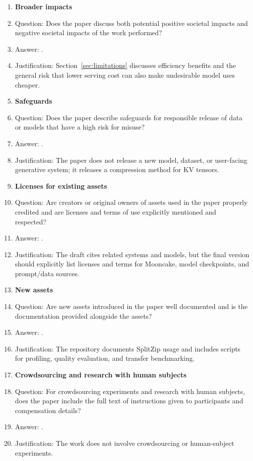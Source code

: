 \begin{enumerate}
\item {\bf Broader impacts}
    \item[] Question: Does the paper discuss both potential positive societal impacts and negative societal impacts of the work performed?
    \item[] Answer: \answerYes{}.
    \item[] Justification: Section~\ref{sec:limitations} discusses efficiency benefits and the general risk that lower serving cost can also make undesirable model uses cheaper.

\item {\bf Safeguards}
    \item[] Question: Does the paper describe safeguards for responsible release of data or models that have a high risk for misuse?
    \item[] Answer: \answerNA{}.
    \item[] Justification: The paper does not release a new model, dataset, or user-facing generative system; it releases a compression method for KV tensors.

\item {\bf Licenses for existing assets}
    \item[] Question: Are creators or original owners of assets used in the paper properly credited and are licenses and terms of use explicitly mentioned and respected?
    \item[] Answer: \answerNo{}.
    \item[] Justification: The draft cites related systems and models, but the final version should explicitly list licenses and terms for Mooncake, model checkpoints, and prompt/data sources.

\item {\bf New assets}
    \item[] Question: Are new assets introduced in the paper well documented and is the documentation provided alongside the assets?
    \item[] Answer: \answerYes{}.
    \item[] Justification: The repository documents SplitZip usage and includes scripts for profiling, quality evaluation, and transfer benchmarking.

\item {\bf Crowdsourcing and research with human subjects}
    \item[] Question: For crowdsourcing experiments and research with human subjects, does the paper include the full text of instructions given to participants and compensation details?
    \item[] Answer: \answerNA{}.
    \item[] Justification: The work does not involve crowdsourcing or human-subject experiments.


\end{enumerate}
